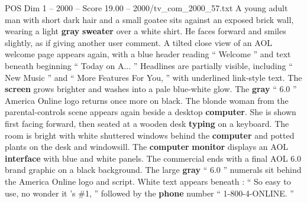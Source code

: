 \begin{textsample}{POS Dim 1 – 2000 – Score 19.00 – 2000/tv\_com\_2000\_57.txt}
A young adult man with short dark hair and a small goatee sits against an exposed brick wall, wearing a light \textbf{gray} \textbf{sweater} over a white shirt.
He faces forward and smiles slightly, as if giving another user comment.
A tilted close view of an AOL welcome page appears again, with a blue header reading “ Welcome ” and text beneath beginning “ Today on A... ” Headlines are partially visible, including “ New Music ” and “ More Features For You, ” with underlined link-style text.
The \textbf{screen} grows brighter and washes into a pale blue-white glow.
The \textbf{gray} “ 6.0 ” America Online logo returns once more on black.
The blonde woman from the parental-controls scene appears again beside a desktop \textbf{computer}.
She is shown first facing forward, then seated at a wooden desk \textbf{typing} on a keyboard.
The room is bright with white shuttered windows behind the \textbf{computer} and potted plants on the desk and windowsill.
The \textbf{computer} \textbf{monitor} displays an AOL \textbf{interface} with blue and white panels.
The commercial ends with a final AOL 6.0 brand graphic on a black background.
The large \textbf{gray} “ 6.0 ” numerals sit behind the America Online logo and script.
White text appears beneath : “ So easy to use, no wonder it ’s \#1, ” followed by the \textbf{phone} number “ 1-800-4-ONLINE. ”

\end{textsample}
